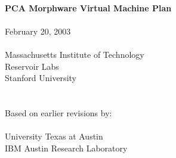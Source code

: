 \documentclass[10pt]{article}
\begin{document}
  \begin{titlepage}
    \begin{center}
      {\LARGE
	~ \\ ~ \\ ~ \\ ~ \\ ~ \\ ~ \\ ~ \\ ~ \\
	{\bf PCA Morphware Virtual Machine Plan \\ ~ \\}
      }
      {\Large
	February 20, 2003 \\ ~ \\
      }
      {\large
	Massachusetts Institute of Technology \\ Reservoir Labs \\ Stanford University \\ ~ \\ ~ \\ 
	Based on earlier revisions by: \\ ~ \vspace{-8pt} \\
	University Texas at Austin \\ IBM Austin Research Laboratory
      }
    \end{center}
  \end{titlepage}

  \newcommand{\mt}[1]{\mbox{\it #1}}
  \newcommand{\todo}[1]{\framebox{\bf #1}}
  \newcommand{\sss}[1]{\medskip \noindent {\bf #1} \smallskip}
  \newcommand{\ssss}[1]{\medskip \noindent {\bf #1:}}

  \tableofcontents


\end{document}
